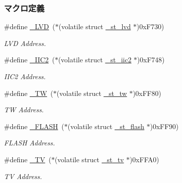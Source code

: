 \subsubsection*{マクロ定義}
\begin{DoxyCompactItemize}
\item 
\#define \hyperlink{3694s_8h_a9909b27f83a32cffb06cd71cf623801a_a9909b27f83a32cffb06cd71cf623801a}{\+\_\+\+L\+V\+D}~($\ast$(volatile struct \hyperlink{3694s_8h_d4/d84/struct__st__lvd}{\+\_\+st\+\_\+lvd}   $\ast$)0x\+F730)
\begin{DoxyCompactList}\small\item\em L\+V\+D Address. \end{DoxyCompactList}\item 
\#define \hyperlink{3694s_8h_aa5e499383e2ecd98923b7d330d629324_aa5e499383e2ecd98923b7d330d629324}{\+\_\+\+I\+I\+C2}~($\ast$(volatile struct \hyperlink{3694s_8h_d8/dd9/struct__st__iic2}{\+\_\+st\+\_\+iic2}  $\ast$)0x\+F748)
\begin{DoxyCompactList}\small\item\em I\+I\+C2 Address. \end{DoxyCompactList}\item 
\#define \hyperlink{3694s_8h_a97cdedef1f0e49c6b2704dd50afd6190_a97cdedef1f0e49c6b2704dd50afd6190}{\+\_\+\+T\+W}~($\ast$(volatile struct \hyperlink{3694s_8h_d4/d2c/struct__st__tw}{\+\_\+st\+\_\+tw}    $\ast$)0x\+F\+F80)
\begin{DoxyCompactList}\small\item\em T\+W Address. \end{DoxyCompactList}\item 
\#define \hyperlink{3694s_8h_a95b02c9549c0b2c0ffd21407561ec99c_a95b02c9549c0b2c0ffd21407561ec99c}{\+\_\+\+F\+L\+A\+S\+H}~($\ast$(volatile struct \hyperlink{3694s_8h_d2/d67/struct__st__flash}{\+\_\+st\+\_\+flash} $\ast$)0x\+F\+F90)
\begin{DoxyCompactList}\small\item\em F\+L\+A\+S\+H Address. \end{DoxyCompactList}\item 
\#define \hyperlink{3694s_8h_a24911c04138634483957813aac79f176_a24911c04138634483957813aac79f176}{\+\_\+\+T\+V}~($\ast$(volatile struct \hyperlink{3694s_8h_d2/d46/struct__st__tv}{\+\_\+st\+\_\+tv}    $\ast$)0x\+F\+F\+A0)
\begin{DoxyCompactList}\small\item\em T\+V Address. \end{DoxyCompactList}\item 

\end{DoxyCompactItemize}
